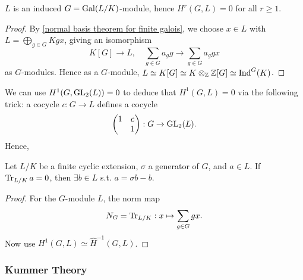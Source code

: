 
\begin{proposition}
    $L$ is an induced $G = \operatorname{Gal}(L/K)$-module, hence
    $H^r(G, L) = 0$ for all $r \ge 1$.
\end{proposition}
\begin{proof}
    By \cref{normal basis theorem for finite galois},
    we choose $x\in L$ with $L = \bigoplus_{g\in G} Kgx$, giving an isomorphism \[K[G]\to L,\quad \sum_{g\in G}a_gg\to\sum_{g\in G}a_ggx\]
    as $G$-modules. Hence as a $G$-module,
    $L\simeq K[G]\simeq K\otimes_{\mathbb{Z}} \mathbb{Z}[G]\simeq\operatorname{Ind}^G(K)$.
\end{proof}
\begin{remark}
    We can use $H^1(G, \operatorname{GL}_2(L)) = 0$ to deduce that $H^1(G, L) = 0$ via the following trick:
    a cocycle $c : G\to L$ defines a cocycle \[\begin{pmatrix}
        1 & c \\ & 1
    \end{pmatrix} : G\to\operatorname{GL}_2(L).\]
    Hence, 
\end{remark}

\begin{corollary}\label{Hilbert 90 - additive}
    Let $L/K$ be a finite cyclic extension, $\sigma$ a generator of $G$, and $a\in L$.
    If $\operatorname{Tr}_{L/K}a = 0$,
    then $\exists b\in L$ s.t. $a = \sigma b - b$.
\end{corollary}
\begin{proof}
    For the $G$-module $L$, the norm map \[N_G = \operatorname{Tr}_{L/K} : x\mapsto \sum_{g\in G}gx.\]
    Now use $H^{1}(G, L) \simeq \hat H^{-1}(G, L)$.
\end{proof}

\subsubsection{Kummer Theory}
